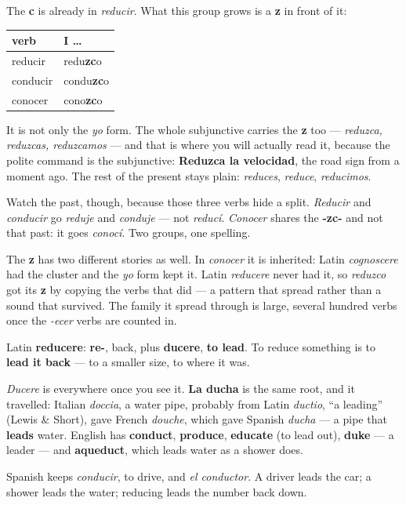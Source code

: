 \begin{grammarlens}[title={Grammar Lens: the -zc- verbs}]
The \textbf{c} is already in \emph{reducir}. What this group grows is a \textbf{z} in front of it:

\noindent
\begin{tabularx}{\linewidth}{@{}>{\raggedright\arraybackslash}X>{\raggedright\arraybackslash}X@{}}
\toprule
\textbf{verb} & \textbf{I …} \\
\midrule
reducir & redu\textbf{zc}o \\
conducir & condu\textbf{zc}o \\
conocer & cono\textbf{zc}o \\
\bottomrule
\end{tabularx}

It is not only the \emph{yo} form. The whole subjunctive carries the \textbf{z} too — \emph{reduzca, reduzcas, reduzcamos} — and that is where you will actually read it, because the polite command is the subjunctive: \textbf{Reduzca la velocidad}, the road sign from a moment ago. The rest of the present stays plain: \emph{reduces}, \emph{reduce}, \emph{reducimos}.

Watch the past, though, because those three verbs hide a split. \emph{Reducir} and \emph{conducir} go \emph{reduje} and \emph{conduje} — not \emph{reducí}. \emph{Conocer} shares the \textbf{-zc-} and not that past: it goes \emph{conocí}. Two groups, one spelling.

The \textbf{z} has two different stories as well. In \emph{conocer} it is inherited: Latin \emph{cognoscere} had the cluster and the \emph{yo} form kept it. Latin \emph{reducere} never had it, so \emph{reduzco} got its \textbf{z} by copying the verbs that did — a pattern that spread rather than a sound that survived. The family it spread through is large, several hundred verbs once the \emph{-ecer} verbs are counted in.
\end{grammarlens}

\begin{cousinweb}
Latin \textbf{reducere}: \textbf{re-}, back, plus \textbf{ducere}, \textbf{to lead}. To reduce something is to \textbf{lead it back} — to a smaller size, to where it was.

\emph{Ducere} is everywhere once you see it. \textbf{La ducha} is the same root, and it travelled: Italian \emph{doccia}, a water pipe, probably from Latin \emph{ductio}, \textquotedblleft{}a leading\textquotedblright{} (Lewis \& Short), gave French \emph{douche}, which gave Spanish \emph{ducha} — a pipe that \textbf{leads} water. English has \textbf{conduct}, \textbf{produce}, \textbf{educate} (to lead out), \textbf{duke} — a leader — and \textbf{aqueduct}, which leads water as a shower does.

Spanish keeps \emph{conducir}, to drive, and \emph{el conductor}. A driver leads the car; a shower leads the water; reducing leads the number back down.
\end{cousinweb}

